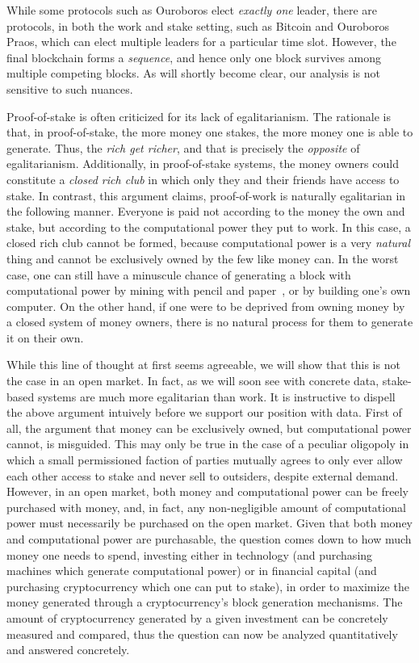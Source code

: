 While some protocols such as Ouroboros elect \emph{exactly one} leader, there
are protocols, in both the work and stake setting, such as Bitcoin and Ouroboros
Praos, which can elect multiple leaders for a particular time slot. However, the
final blockchain forms a \emph{sequence}, and hence only one block survives among multiple competing blocks.
As will shortly become clear, our analysis is not sensitive to such nuances.

Proof-of-stake is often criticized for its lack of egalitarianism. The rationale
is that, in proof-of-stake, the more money one stakes, the more money one is
able to generate. Thus, the \emph{rich get richer}, and that is precisely the
\emph{opposite} of egalitarianism. Additionally, in proof-of-stake systems, the
money owners could constitute a \emph{closed rich club} in which only they and
their friends have access to stake. In contrast, this argument claims,
proof-of-work is naturally egalitarian in the following manner. Everyone is paid
not according to the money the own and stake, but according to the computational
power they put to work. In this case, a closed rich club cannot be formed,
because computational power is a very \emph{natural} thing and cannot be
exclusively owned by the few like money can. In the worst case, one can still
have a minuscule chance of generating a block with computational power by mining
with pencil and paper~\cite{paper-mining}, or by building one's own computer. On
the other hand, if one were to be deprived from owning money by a closed system
of money owners, there is no natural process for them to generate it on their
own.

While this line of thought at first seems agreeable, we will show that this
is not the case in an open market. In fact, as we will soon see with concrete
data, stake-based systems are much more egalitarian than work. It is instructive
to dispell the above argument intuively before we support our position with
data. First of all, the argument that money can be exclusively owned, but
computational power cannot, is misguided. This may only be true in the case of
a peculiar oligopoly in which a small permissioned faction of parties mutually
agrees to only ever allow each other access to stake and never sell to
outsiders, despite external demand. However, in an open market, both money and
computational power can be freely purchased with money, and, in fact, any
non-negligible amount of computational power must necessarily be purchased on
the open market. Given that both money and computational power are purchasable,
the question comes down to how much money one needs to spend, investing either
in technology (and purchasing machines which generate computational power) or in
financial capital (and purchasing cryptocurrency which one can put to stake), in
order to maximize the money generated through a cryptocurrency's block
generation mechanisms. The amount of cryptocurrency generated by a given
investment can be concretely measured and compared, thus the question can now be
analyzed quantitatively and answered concretely.
